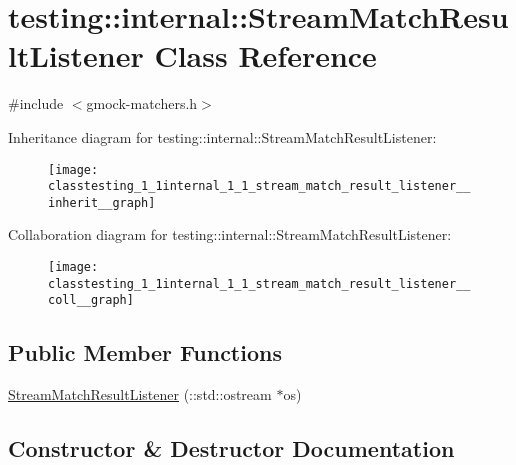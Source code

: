 \hypertarget{classtesting_1_1internal_1_1_stream_match_result_listener}{}\section{testing\+:\+:internal\+:\+:Stream\+Match\+Result\+Listener Class Reference}
\label{classtesting_1_1internal_1_1_stream_match_result_listener}


{\ttfamily \#include $<$gmock-\/matchers.\+h$>$}



Inheritance diagram for testing\+:\+:internal\+:\+:Stream\+Match\+Result\+Listener\+:
\nopagebreak
\begin{figure}[H]
\begin{center}
\leavevmode
\texttt{[image: classtesting\_1\_1internal\_1\_1\_stream\_match\_result\_listener\_\_inherit\_\_graph]}
\end{center}
\end{figure}


Collaboration diagram for testing\+:\+:internal\+:\+:Stream\+Match\+Result\+Listener\+:
\nopagebreak
\begin{figure}[H]
\begin{center}
\leavevmode
\texttt{[image: classtesting\_1\_1internal\_1\_1\_stream\_match\_result\_listener\_\_coll\_\_graph]}
\end{center}
\end{figure}
\subsection*{Public Member Functions}
\begin{DoxyCompactItemize}
\item 
\hyperlink{classtesting_1_1internal_1_1_stream_match_result_listener_a81985760741d818745237df002d65d04}{Stream\+Match\+Result\+Listener} (\+::std\+::ostream $\ast$os)
\end{DoxyCompactItemize}


\subsection{Constructor \& Destructor Documentation}
